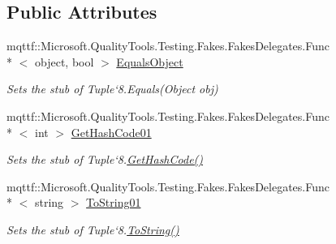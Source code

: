 \subsection*{Public Attributes}
\begin{DoxyCompactItemize}
\item 
mqttf\-::\-Microsoft.\-Quality\-Tools.\-Testing.\-Fakes.\-Fakes\-Delegates.\-Func\\*
$<$ object, bool $>$ \hyperlink{class_system_1_1_fakes_1_1_stub_tuple_3_01_t1_00_01_t2_00_01_t3_00_01_t4_00_01_t5_00_01_t6_00_01_t7_00_01_t_rest_01_4_add863077f46ed66ddc2ddea89b7c0c62}{Equals\-Object}
\begin{DoxyCompactList}\small\item\em Sets the stub of Tuple`8.Equals(\-Object obj)\end{DoxyCompactList}\item 
mqttf\-::\-Microsoft.\-Quality\-Tools.\-Testing.\-Fakes.\-Fakes\-Delegates.\-Func\\*
$<$ int $>$ \hyperlink{class_system_1_1_fakes_1_1_stub_tuple_3_01_t1_00_01_t2_00_01_t3_00_01_t4_00_01_t5_00_01_t6_00_01_t7_00_01_t_rest_01_4_ac5264ace9722f3cf529164ec703d1205}{Get\-Hash\-Code01}
\begin{DoxyCompactList}\small\item\em Sets the stub of Tuple`8.\hyperlink{class_system_1_1_fakes_1_1_stub_tuple_3_01_t1_00_01_t2_00_01_t3_00_01_t4_00_01_t5_00_01_t6_00_01_t7_00_01_t_rest_01_4_aae6e7f5ad603618382c370ddc3ea8c81}{Get\-Hash\-Code()}\end{DoxyCompactList}\item 
mqttf\-::\-Microsoft.\-Quality\-Tools.\-Testing.\-Fakes.\-Fakes\-Delegates.\-Func\\*
$<$ string $>$ \hyperlink{class_system_1_1_fakes_1_1_stub_tuple_3_01_t1_00_01_t2_00_01_t3_00_01_t4_00_01_t5_00_01_t6_00_01_t7_00_01_t_rest_01_4_afb75db4de1d80921948f514989ef569a}{To\-String01}
\begin{DoxyCompactList}\small\item\em Sets the stub of Tuple`8.\hyperlink{class_system_1_1_fakes_1_1_stub_tuple_3_01_t1_00_01_t2_00_01_t3_00_01_t4_00_01_t5_00_01_t6_00_01_t7_00_01_t_rest_01_4_af267b4c3ec9efe8c69e768b31e20ca13}{To\-String()}\end{DoxyCompactList}\end{DoxyCompactItemize}
